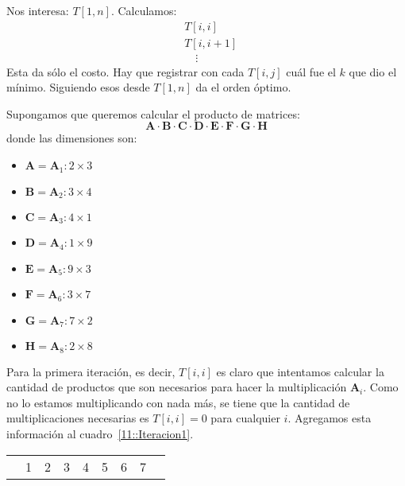   Nos interesa: \(T[1, n]\).
  Calculamos:
  \begin{align*}
    &T[i, i] \\
    &T[i, i+1] \\
    &\quad\vdots
  \end{align*}
  Esta da sólo el costo.
  Hay que registrar con cada \(T[i, j]\) cuál fue el \(k\)
  que dio el mínimo.
  Siguiendo esos desde \(T[1, n]\) da el orden óptimo.
  \begin{ejemplo}
    Supongamos que queremos calcular el producto de matrices:
    \begin{equation*}
      \mathbf{A}
	\cdot \mathbf{B}
	\cdot \mathbf{C}
	\cdot \mathbf{D}
	\cdot \mathbf{E}
	\cdot \mathbf{F}
	\cdot \mathbf{G}
	\cdot \mathbf{H}
    \end{equation*}
    donde las dimensiones son:
    \begin{itemize}
    \item \(\mathbf{A} = \mathbf{A}_1 \colon 2 \times 3\)
    \item \(\mathbf{B} = \mathbf{A}_2 \colon 3 \times 4\)
    \item \(\mathbf{C} = \mathbf{A}_3 \colon 4 \times 1\)
    \item \(\mathbf{D} = \mathbf{A}_4 \colon 1 \times 9\)
    \item \(\mathbf{E} = \mathbf{A}_5 \colon 9 \times 3\)
    \item \(\mathbf{F} = \mathbf{A}_6 \colon 3 \times 7\)
    \item \(\mathbf{G} = \mathbf{A}_7 \colon 7 \times 2\)
    \item \(\mathbf{H} = \mathbf{A}_8 \colon 2 \times 8\)
    \end{itemize}
    Para la primera iteración,
    es decir,
    \(T[i, i]\)
    es claro que intentamos calcular la cantidad de productos
    que son necesarios para hacer la multiplicación \(\mathbf{A}_i\).
    Como no lo estamos multiplicando con nada más,
    se tiene que la cantidad de multiplicaciones necesarias
    es \(T[i, i] = 0\) para cualquier \(i\).
    Agregamos esta información al cuadro~\ref{11::Iteracion1}.
    \begin{table}[ht]
      \centering
      \begin{tabular}{*{8}{M|}M|}
	 & 
	     & 
	     & 
	     & 
	     & 
	     & 
	     & 

\end{tabular}
\end{table}
\end{ejemplo}
